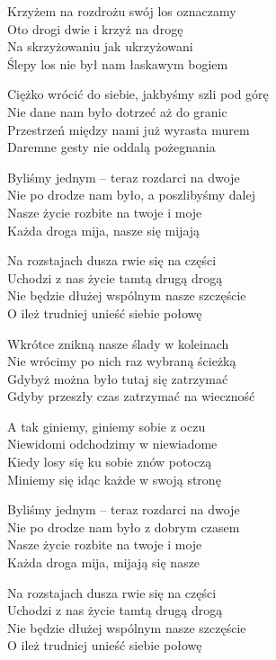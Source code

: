 \begin{text}
    \hfill\break
Krzyżem na rozdrożu swój los oznaczamy\\
Oto drogi dwie i krzyż na drogę\\
Na skrzyżowaniu jak ukrzyżowani\\
Ślepy los nie był nam łaskawym bogiem

Ciężko wrócić do siebie, jakbyśmy szli pod górę\\
Nie dane nam było dotrzeć aż do granic\\
Przestrzeń między nami już wyrasta murem\\
Daremne gesty nie oddalą pożegnania

    \vin Byliśmy jednym – teraz rozdarci na dwoje\\
    \vin Nie po drodze nam było, a poszlibyśmy dalej\\
    \vin Nasze życie rozbite na twoje i moje\\
    \vin Każda droga mija, nasze się mijają

    \vin Na rozstajach dusza rwie się na części\\
    \vin Uchodzi z nas życie tamtą drugą drogą\\
    \vin Nie będzie dłużej wspólnym nasze szczęście\\
    \vin O ileż trudniej unieść siebie połowę

Wkrótce znikną nasze ślady w koleinach\\
Nie wrócimy po nich raz wybraną ścieżką\\
Gdybyż można było tutaj się zatrzymać\\
Gdyby przeszły czas zatrzymać na wieczność

A tak giniemy, giniemy sobie z oczu\\
Niewidomi odchodzimy w niewiadome\\
Kiedy losy się ku sobie znów potoczą\\
Miniemy się idąc każde w swoją stronę

Byliśmy jednym – teraz rozdarci na dwoje\\
Nie po drodze nam było z dobrym czasem\\
Nasze życie rozbite na twoje i moje\\
Każda droga mija, mijają się nasze

Na rozstajach dusza rwie się na części\\
Uchodzi z nas życie tamtą drugą drogą\\
Nie będzie dłużej wspólnym nasze szczęście\\
O ileż trudniej unieść siebie połowę


\end{text}

